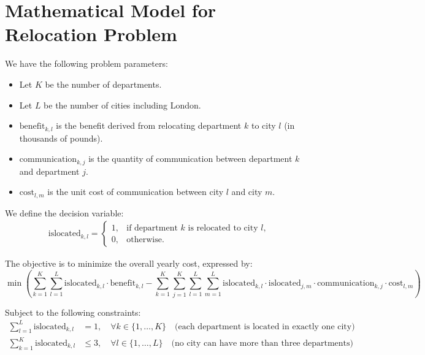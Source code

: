 \documentclass{article}
\begin{document}
\section*{Mathematical Model for Relocation Problem}

We have the following problem parameters:
\begin{itemize}
    \item Let \( K \) be the number of departments.
    \item Let \( L \) be the number of cities including London.
    \item \( \text{benefit}_{k, l} \) is the benefit derived from relocating department \( k \) to city \( l \) (in thousands of pounds).
    \item \( \text{communication}_{k, j} \) is the quantity of communication between department \( k \) and department \( j \).
    \item \( \text{cost}_{l, m} \) is the unit cost of communication between city \( l \) and city \( m \).
\end{itemize}

We define the decision variable:
\[
\begin{align*}
\text{islocated}_{k, l} = 
\begin{cases} 
1, & \text{if department } k \text{ is relocated to city } l, \\
0, & \text{otherwise}.
\end{cases}
\end{align*}
\]

The objective is to minimize the overall yearly cost, expressed by:
\[
\min \left( \sum_{k=1}^{K} \sum_{l=1}^{L} \text{islocated}_{k, l} \cdot \text{benefit}_{k, l} - \sum_{k=1}^{K} \sum_{j=1}^{K} \sum_{l=1}^{L} \sum_{m=1}^{L} \text{islocated}_{k, l} \cdot \text{islocated}_{j, m} \cdot \text{communication}_{k, j} \cdot \text{cost}_{l, m} \right)
\]

Subject to the following constraints:
\begin{align}
\sum_{l=1}^{L} \text{islocated}_{k, l} &= 1, \quad \forall k \in \{1, \ldots, K\} \quad \text{(each department is located in exactly one city)} \\
\sum_{k=1}^{K} \text{islocated}_{k, l} &\leq 3, \quad \forall l \in \{1, \ldots, L\} \quad \text{(no city can have more than three departments)}
\end{align}
\end{document}
